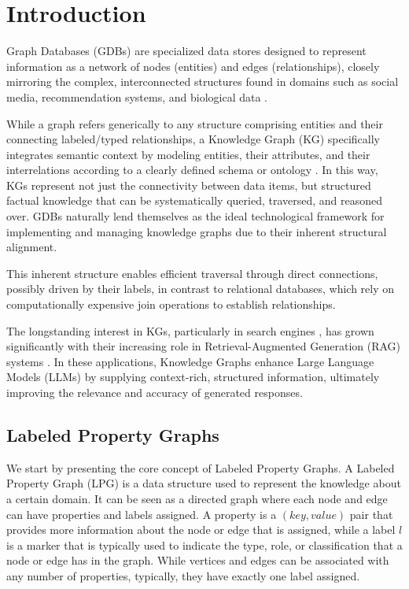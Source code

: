 \chapter{Introduction}
\label{chap:introduction}

Graph Databases (GDBs) are specialized data stores designed to represent information as a network of nodes (entities) and edges (relationships), closely mirroring the complex, interconnected structures found in domains such as social media, recommendation systems, and biological data \cite{gdbmodels}. 

While a graph refers generically to any structure comprising entities and their connecting labeled/typed relationships, a Knowledge Graph (KG) specifically integrates semantic context by modeling entities, their attributes, and their interrelations according to a clearly defined schema or ontology \cite{ontology}. In this way, KGs represent not just the connectivity between data items, but structured factual knowledge that can be systematically queried, traversed, and reasoned over. GDBs naturally lend themselves as the ideal technological framework for implementing and managing knowledge graphs due to their inherent structural alignment.

This inherent structure enables efficient traversal through direct connections, possibly driven by their labels, in contrast to relational databases, which rely on computationally expensive join operations to establish relationships.

The longstanding interest in KGs, particularly in search engines \cite{GoogleKG}, has grown significantly with their increasing role in Retrieval-Augmented Generation (RAG) systems \cite{rag}. In these applications, Knowledge Graphs enhance Large Language Models (LLMs) by supplying context-rich, structured information, ultimately improving the relevance and accuracy of generated responses.

\section{Labeled Property Graphs}

We start by presenting the core concept of Labeled Property Graphs. A Labeled Property Graph (LPG) is a data structure used to represent the knowledge about a certain domain. It can be seen as a directed graph where each node and edge can have properties and labels assigned. A property is a $(\mathit{key}, \mathit{value})$ pair that provides more information about the node or edge that is assigned, while a label $l$ is a marker that is typically used to indicate the type, role, or classification that a node or edge has in the graph. While vertices and edges can be associated with any number of properties, typically, they have exactly one label assigned.
    
